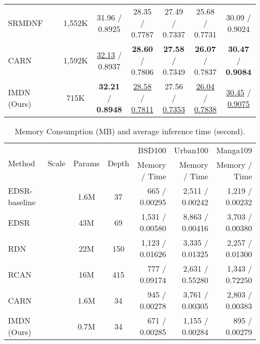 \documentclass[sigconf]{acmart}
\begin{document}
\begin{table*}[htpb]
\begin{tabular}{|l|c|c|c|c|c|c|c|}
		SRMDNF~\cite{SRMDNF} &  & 1,552K & 31.96 / 0.8925 & 28.35 / 0.7787 & 27.49 / 0.7337 & 25.68 / 0.7731 & 30.09 / 0.9024\\
		
		CARN~\cite{CARN} &  & 1,592K & \underline{32.13} / 0.8937 & \textbf{28.60} / 0.7806 &  \textbf{27.58} / 0.7349 & \textbf{26.07} / 0.7837  & \textbf{30.47} / \textbf{0.9084} \\
		
		IMDN (Ours) &  & 715K & \textbf{32.21} / \textbf{0.8948} & \underline{28.58} / \underline{0.7811} & 27.56 / \underline{0.7353} & \underline{26.04} / \underline{0.7838} & \underline{30.45} / \underline{0.9075} \\
		\hline
		
	\end{tabular}
	\label{tab:psnr-ssim}
\end{table*}

\begin{table*}[htpb]
	\caption{Memory Consumption (MB) and average inference time (second).}
	\label{tab:memory-time}
	\begin{center}
		\begin{tabular}{|l|c|c|c|r|r|r|}
			\hline
			\multirow{2}{*}{Method} & \multirow{2}{*}{Scale} & \multirow{2}{*}{Params} & \multirow{2}{*}{Depth} & BSD100 & Urban100 & Manga109 \\
			\cline{5-7}
			& & & & Memory / Time & Memory / Time & Memory / Time \\
			\hline
			\hline
			EDSR-baseline~\cite{EDSR} & \multirow{6}{*}{} & 1.6M & 37 & 665 / 0.00295 & 2,511 / 0.00242 & 1,219 / 0.00232 \\
			
			EDSR~\cite{EDSR} &  & 43M & 69 & 1,531 / 0.00580 & 8,863 / 0.00416 & 3,703 / 0.00380 \\
			
			RDN~\cite{RDN} &  & 22M & 150 & 1,123 / 0.01626 & 3,335 / 0.01325 & 2,257 / 0.01300 \\
			
			RCAN~\cite{RCAN} &  & 16M & 415 & 777 / 0.09174 & 2,631 / 0.55280 & 1,343 / 0.72250 \\
			
			CARN~\cite{CARN} &  & 1.6M & 34 & 945 / 0.00278 & 3,761 / 0.00305 & 2,803 / 0.00383 \\
			
			IMDN (Ours) & & 0.7M & 34 & 671 / 0.00285 & 1,155 / 0.00284 & 895 / 0.00279 \\
			
			\hline
		\end{tabular}
	\end{center}
\end{table*}
\end{document}

